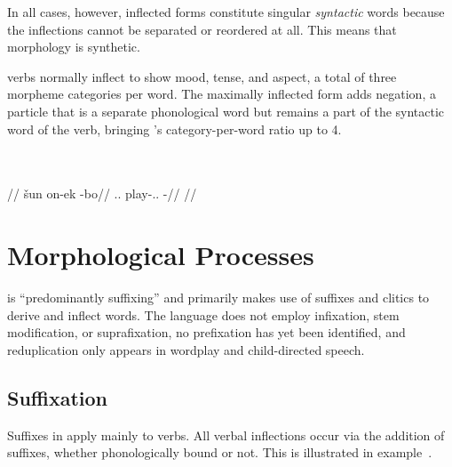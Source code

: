 In all cases, however, inflected forms constitute singular \emph{syntactic} words because the inflections cannot be separated or reordered at all. This means that \langtvk{} morphology is synthetic\autocite{wals-22}.

\langtvk{} verbs normally inflect to show mood, tense, and aspect, a total of three morpheme categories per word. The maximally inflected form adds negation, a particle that is a separate phonological word but remains a part of the syntactic word of the verb, bringing \langtvk's category-per-word ratio up to 4\autocite{wals-22}.

	\begingl
		\glpreamble{}\\
		\\
		//
		\gla šun on-ek -bo//
		\glb \Tps.\An.\Top{} play-\Ind.\Pst.\Pfv{} -\Neg//
		\glft{}//
	\endgl
\xe



\section{Morphological Processes}
\label{sec:tvk-processes}

\langtvk{} is \enquote{predominantly suffixing}\autocite{wals-26} and primarily makes use of suffixes and clitics to derive and inflect words. The language does not employ infixation, stem modification, or suprafixation, no prefixation has yet been identified, and reduplication only appears in wordplay and child-directed speech.

\subsection{Suffixation}
\label{subsec:tvk-suffixation}

Suffixes in \langtvk{} apply mainly to verbs. All verbal inflections occur via the addition of suffixes, whether phonologically bound or not. This is illustrated in example~.

